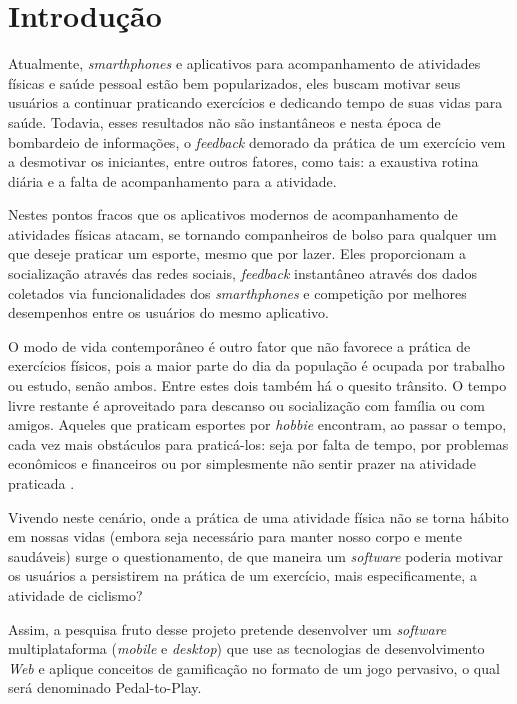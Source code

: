 \chapter{Introdução} \label{cap:introducao}
Atualmente, \textit{smarthphones} e aplicativos para acompanhamento de atividades físicas e saúde pessoal estão bem popularizados, eles buscam motivar seus usuários a continuar praticando exercícios e dedicando tempo de suas vidas para saúde. Todavia, esses resultados não são instantâneos e nesta época de bombardeio de informações, o \textit{feedback} demorado da prática de um exercício vem a desmotivar os iniciantes, entre outros fatores, como tais: a exaustiva rotina diária e a falta de acompanhamento para a atividade. \par 

Nestes pontos fracos que os aplicativos modernos de acompanhamento de atividades físicas atacam, se tornando companheiros de bolso para qualquer um que deseje praticar um esporte, mesmo que por lazer. Eles proporcionam a socialização através das redes sociais, \textit{feedback} instantâneo através dos dados coletados via funcionalidades dos \textit{smarthphones} e competição por melhores desempenhos entre os usuários do mesmo aplicativo. \par

O modo de vida contemporâneo é outro fator que não favorece a prática de exercícios físicos, pois a maior parte do dia da população é ocupada por trabalho ou estudo, senão ambos. Entre estes dois também há o quesito trânsito. O tempo livre restante é aproveitado para descanso ou socialização com família ou com amigos. Aqueles que praticam esportes por \textit{hobbie} encontram, ao passar o tempo, cada vez mais obstáculos para praticá-los: seja por falta de tempo, por problemas econômicos e financeiros ou por simplesmente não sentir prazer na atividade praticada \cite{butcher2002, liz2013}. \par

Vivendo neste cenário, onde a prática de uma atividade física não se torna hábito em nossas vidas (embora seja necessário para manter nosso corpo e mente saudáveis) surge o questionamento, de que maneira um \textit{software} poderia motivar os usuários a persistirem na prática de um exercício, mais especificamente, a atividade de ciclismo? \par

Assim, a pesquisa fruto desse projeto pretende desenvolver um \textit{software} multiplataforma (\textit{mobile} e \textit{desktop}) que use as tecnologias de desenvolvimento \textit{Web} e aplique conceitos de gamificação no formato de um jogo pervasivo, o qual será denominado Pedal-to-Play. \par

